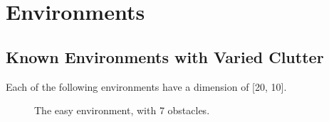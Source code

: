 \chapter{Environments}
\label{app:environments}

\section{Known Environments with Varied Clutter}
Each of the following environments have a dimension of [20, 10]. 
\begin{figure}[H]
    \centering
    \caption{The easy environment, with 7 obstacles.}
    \label{fig:easy_flat}
\end{figure}
